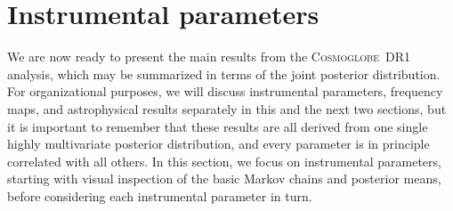 \documentclass[twocolumn]{../../common/aa}
\def\WMAP{\emph{WMAP}}
\newcommand{\BP}{\textsc{BeyondPlanck}}
\newcommand{\cosmoglobe}{\textsc{Cosmoglobe}}
\begin{document}












\section{Instrumental parameters}
\label{sec:instrument}

We are now ready to present the main results from the \cosmoglobe\ DR1 analysis, which may be summarized in terms of the joint posterior distribution. For organizational purposes, we will discuss instrumental parameters, frequency maps, and astrophysical results separately in this and the next two sections, but it is important to remember that these results are all derived from one single highly multivariate posterior distribution, and every parameter is in principle correlated with all others. In this section, we focus on instrumental parameters, starting with visual inspection of the basic Markov chains and posterior means, before considering each instrumental parameter in turn.
\end{document}
